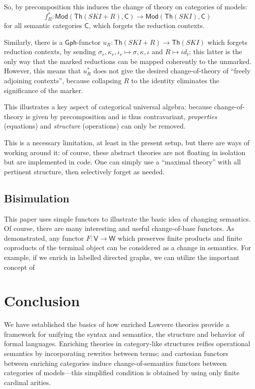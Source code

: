 \documentclass{amsart}
\theoremstyle{definition}
\newcommand{\Th}{\mathsf{Th}}
\newcommand{\Gph}{\mathsf{Gph}}
\newcommand{\Mod}{\mathsf{Mod}}
\newcommand{\V}{\mathsf{V}}
\newcommand{\W}{\mathsf{W}}
\newcommand{\C}{\mathsf{C}}
\newcommand{\maps}{\colon}
\begin{document}
So, by precomposition this induces the change of theory on categories of models: $$f_R^*\maps \Mod(\Th(SKI+R),\C) \to \Mod(\Th(SKI),\C)$$ for all semantic categories $\C$, which forgets the reduction contexts.

Similarly, there is a $\Gph$-functor $u_R\maps \Th(SKI+R)\to \Th(SKI)$ which forgets reduction contexts, by sending $\sigma_r,\kappa_r,\iota_r \mapsto\sigma, \kappa,\iota$ and $R \mapsto id_t$; this latter is the only way that the marked reductions can be mapped coherently to the unmarked. However, this means that $u_R^*$ does not give the desired change-of-theory of ``freely adjoining contexts'', because collapsing $R$ to the identity eliminates the significance of the marker.

This illustrates a key aspect of categorical universal algebra: because change-of-theory is given by precomposition and is thus contravariant, \textit{properties} (equations) and \textit{structure} (operations) can only be removed.

This is a necessary limitation, at least in the present setup, but there are ways of working around it: of course, these abstract theories are not floating in isolation but are implemented in code. One can simply use a ``maximal theory'' with all pertinent structure, then selectively forget as needed.

\subsection{Bisimulation}
\label{ssec:multisorted}

This paper uses simple functors to illustrate the basic idea of changing semantics. Of course, there are many interesting and useful change-of-base functors. As demonstrated, any functor $F\maps \V\to \W$ which preserves finite products and finite coproducts of the terminal object can be considered as a change in semantics. For example, if we enrich in labelled directed graphs, we can utilize the important concept of 

\section{Conclusion}

We have established the basics of how enriched Lawvere theories provide a framework for unifying the syntax and semantics, the structure and behavior of formal languages. Enriching theories in category-like structures reifies operational semantics by incorporating rewrites between terms; and cartesian functors between enriching categories induce change-of-semantics functors between categories of models---this simplified condition is obtained by using only finite cardinal arities.
\end{document}
